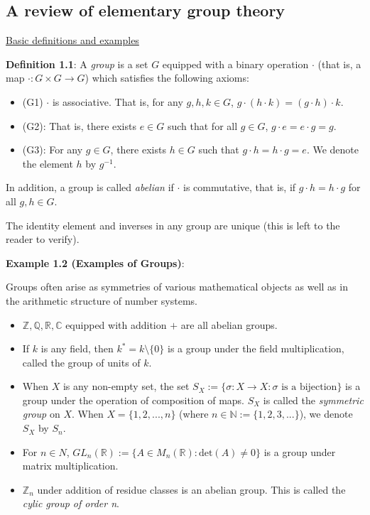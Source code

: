 \documentclass[12pt]{article}
\newcommand{\vs}{\vskip10pt}
\begin{document}
	
	\subsection{A review of elementary group theory}
	
	\underline{Basic definitions and examples}
	
	\vs
	
	\textbf{Definition 1.1}: A \textit{group} is a set $G$ equipped with a binary operation $\cdot$ (that is, a map $\cdot: G \times G \rightarrow G$) which satisfies the following axioms: 
	
	\begin{itemize}
		\item (G1) $\cdot$ is associative. That is, for any $g,h,k \in G$, $g\cdot(h \cdot k) = (g \cdot h) \cdot k$.
		\item (G2): That is, there exists $e \in G$ such that for all $g \in G$, $g\cdot e = e \cdot g = g$.
		\item (G3): For any $g \in G$, there exists $h \in G$ such that $g \cdot h = h \cdot g = e$. We denote the element $h$ by $g^{-1}$.
	\end{itemize}

	In addition, a group is called \textit{abelian} if $\cdot$ is commutative, that is, if $g \cdot h = h \cdot g$ for all $g,h \in G$. 
	
	\vs 
	
	The identity element and inverses in any group are unique (this is left to the reader to verify). 
	
	\vs
	
	\textbf{Example 1.2 (Examples of Groups)}: 
	
	Groups often arise as symmetries of various mathematical objects as well as in the arithmetic structure of number systems.
	
	\begin{itemize}
		\item $\mathbb{Z}, \mathbb{Q}, \mathbb{R}, \mathbb{C}$ equipped with addition $+$ are all abelian groups. 
		\item If $k$ is any field, then $k^{*} = k \setminus \{0\}$ is a group under the field multiplication, called the group of units of $k$.
		\item When $X$ is any non-empty set, the set $S_X := \{\sigma: X \rightarrow X  : \sigma \text{ is a bijection}\}$ is a group under the operation of composition of maps. $S_X$ is called the \textit{symmetric group} on $X$. When $X = \{1,2,...,n\}$ (where $n \in \mathbb{N} := \{1,2,3,...\}$), we denote $S_X$ by $S_n$.
		\item For $n \in N$, $GL_n(\mathbb{R}) := \{A \in M_n(\mathbb{R})  : \text{det}(A) \neq 0\}$ is a group under matrix multiplication. 
		\item $\mathbb{Z}_n$ under addition of residue classes is an abelian group. This is called the \textit{cylic group of order n}. 
	\end{itemize}
\end{document}
